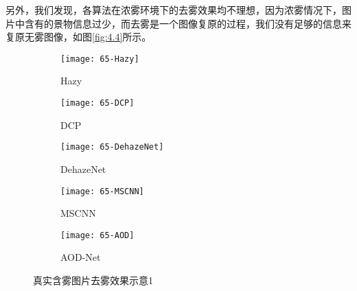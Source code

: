 \documentclass[a4paper, 12pt, oneside]{report}
\begin{document}
{另外，我们发现，各算法在浓雾环境下的去雾效果均不理想，因为浓雾情况下，图片中含有的景物信息过少，而去雾是一个图像复原的过程，我们没有足够的信息来复原无雾图像，如图\ref{fig:4.4}所示。
\begin{figure}[H]
    \centering
            \begin{subfigure}{.9\linewidth}
                \texttt{[image: 65-Hazy]}
                \caption{Hazy}
                \label{fig:sfig11111}
            \end{subfigure}
        \endminipage\hfill
        \begin{subfigure}{.9\linewidth}
            \texttt{[image: 65-DCP]}
            \caption{DCP}
            \label{fig:sfig22222}
        \end{subfigure} 
        \begin{subfigure}{.9\linewidth}
            \texttt{[image: 65-DehazeNet]}
            \caption{DehazeNet}
            \label{fig:sfig33333}
        \end{subfigure} 
    \endminipage\hfill
        \begin{subfigure}{.9\linewidth}
            \texttt{[image: 65-MSCNN]}
            \caption{MSCNN}
            \label{fig:sfig44444}
        \end{subfigure} 
        \begin{subfigure}{.9\linewidth}
            \texttt{[image: 65-AOD]}
            \caption{AOD-Net}
            \label{fig:sfig55555}
        \end{subfigure} 
    	\endminipage
    \caption{真实含雾图片去雾效果示意1}
	\label{fig:4.5}
\end{figure}
}
\end{document}
